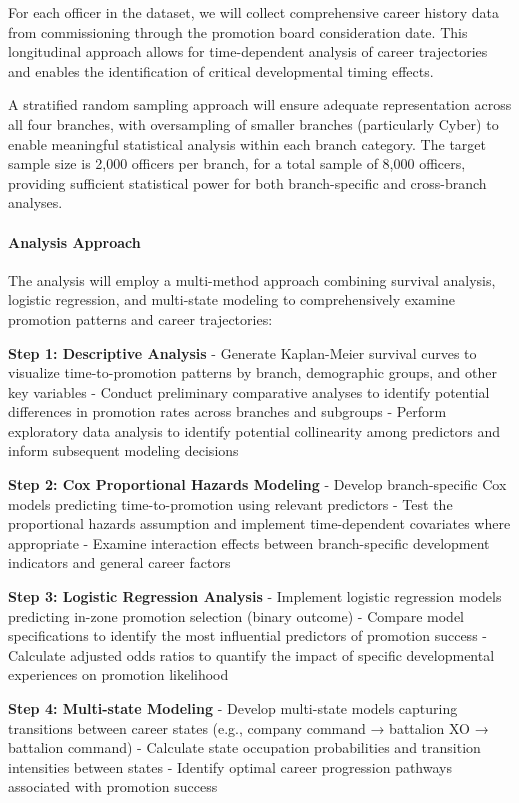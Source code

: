 \documentclass[./main.tex]{subfiles}
\begin{document}
For each officer in the dataset, we will collect comprehensive career
history data from commissioning through the promotion board
consideration date. This longitudinal approach allows for time-dependent
analysis of career trajectories and enables the identification of
critical developmental timing effects.

A stratified random sampling approach will ensure adequate
representation across all four branches, with oversampling of smaller
branches (particularly Cyber) to enable meaningful statistical analysis
within each branch category. The target sample size is 2,000 officers
per branch, for a total sample of 8,000 officers, providing sufficient
statistical power for both branch-specific and cross-branch analyses.

\paragraph{Analysis Approach}\label{analysis-approach}

The analysis will employ a multi-method approach combining survival
analysis, logistic regression, and multi-state modeling to
comprehensively examine promotion patterns and career trajectories:

\textbf{Step 1: Descriptive Analysis} - Generate Kaplan-Meier survival
curves to visualize time-to-promotion patterns by branch, demographic
groups, and other key variables - Conduct preliminary comparative
analyses to identify potential differences in promotion rates across
branches and subgroups - Perform exploratory data analysis to identify
potential collinearity among predictors and inform subsequent modeling
decisions

\textbf{Step 2: Cox Proportional Hazards Modeling} - Develop
branch-specific Cox models predicting time-to-promotion using relevant
predictors - Test the proportional hazards assumption and implement
time-dependent covariates where appropriate - Examine interaction
effects between branch-specific development indicators and general
career factors

\textbf{Step 3: Logistic Regression Analysis} - Implement logistic
regression models predicting in-zone promotion selection (binary
outcome) - Compare model specifications to identify the most influential
predictors of promotion success - Calculate adjusted odds ratios to
quantify the impact of specific developmental experiences on promotion
likelihood

\textbf{Step 4: Multi-state Modeling} - Develop multi-state models
capturing transitions between career states (e.g., company command →
battalion XO → battalion command) - Calculate state occupation
probabilities and transition intensities between states - Identify
optimal career progression pathways associated with promotion success
\end{document}
